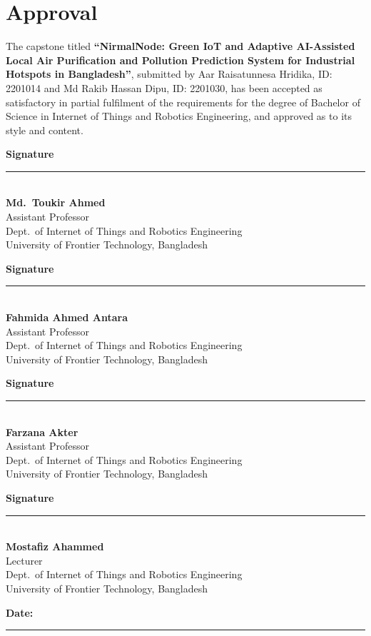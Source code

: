 \chapter*{Approval}

The capstone titled \textbf{``NirmalNode: Green IoT and Adaptive AI-Assisted Local Air Purification and Pollution Prediction System for Industrial Hotspots in Bangladesh''}, submitted by Aar Raisatunnesa Hridika, ID: 2201014 and Md Rakib Hassan Dipu, ID: 2201030, has been accepted as satisfactory in partial fulfilment of the requirements for the degree of Bachelor of Science in Internet of Things and Robotics Engineering, and approved as to its style and content.

\vspace{0.7cm}

\noindent
\begin{minipage}[t]{0.46\textwidth}
\textbf{Signature}\\[-0.1cm]
\rule{\linewidth}{0.4pt}\\[0.15cm]
\textbf{Md.\ Toukir Ahmed}\\
Assistant Professor\\
Dept.\ of Internet of Things and Robotics Engineering\\
University of Frontier Technology, Bangladesh
\end{minipage}
\hfill
\begin{minipage}[t]{0.46\textwidth}
\textbf{Signature}\\[-0.1cm]
\rule{\linewidth}{0.4pt}\\[0.15cm]
\textbf{Fahmida Ahmed Antara}\\
Assistant Professor\\
Dept.\ of Internet of Things and Robotics Engineering\\
University of Frontier Technology, Bangladesh
\end{minipage}

\vspace{0.65cm}

\noindent
\begin{minipage}[t]{0.46\textwidth}
\textbf{Signature}\\[-0.1cm]
\rule{\linewidth}{0.4pt}\\[0.15cm]
\textbf{Farzana Akter}\\
Assistant Professor\\
Dept.\ of Internet of Things and Robotics Engineering\\
University of Frontier Technology, Bangladesh
\end{minipage}
\hfill
\begin{minipage}[t]{0.46\textwidth}
\textbf{Signature}\\[-0.1cm]
\rule{\linewidth}{0.4pt}\\[0.15cm]
\textbf{Mostafiz Ahammed}\\
Lecturer\\
Dept.\ of Internet of Things and Robotics Engineering\\
University of Frontier Technology, Bangladesh
\end{minipage}

\vspace{0.65cm}

\noindent


\vfill

\noindent
\textbf{Date:} \rule{4.5cm}{0.4pt}
